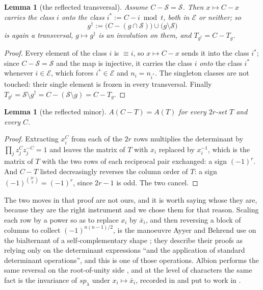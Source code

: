 \documentclass[11pt,reqno]{amsart}
\theoremstyle{plain}
\newtheorem{lemma}[theorem]{Lemma}
\theoremstyle{definition}
\begin{document}
\begin{lemma}[the reflected transversal]\label{lem:reflact}
Assume $C-\mathcal{S}=\mathcal{S}$. Then $x\mapsto C-x$ carries the class $i$ onto the class
$i^{*}:=C-i \bmod t$, both in $\mathcal{E}$ or neither; so
\[
g^{\dagger}:=\bigl(C-(g\cap\mathcal{S})\bigr)\cup\bigl(g\setminus\mathcal{S}\bigr)
\]
is again a transversal, $g\mapsto g^{\dagger}$ is an involution on them, and $T_{g^{\dagger}}=C-T_g$.
\end{lemma}

\begin{proof}
Every element of the class $i$ is $\equiv i$, so $x\mapsto C-x$ sends it into the class $i^{*}$; since
$C-\mathcal{S}=\mathcal{S}$ and the map is injective, it carries the class $i$ \emph{onto} the
class $i^{*}$ whenever $i\in\mathcal{E}$, which forces $i^{*}\in\mathcal{E}$ and $n_i=n_{i^{*}}$. The
singleton classes are not touched: their single element is frozen in every transversal. Finally
$T_{g^{\dagger}}=\mathcal{S}\setminus g^{\dagger}=C-(\mathcal{S}\setminus g)=C-T_g$.
\end{proof}

\begin{lemma}[the reflected minor]\label{lem:Arefl}
$A(C-T)=A(T)$ for every $2r$-set $T$ and every $C$.
\end{lemma}

\begin{proof}
Extracting $x_i^{C}$ from each of the $2r$ rows multiplies the determinant by
$\prod_j z_j^{C}z_j^{-C}=1$ and leaves the matrix of $T$ with $x_i$ replaced by $x_i^{-1}$, which is
the matrix of $T$ with the two rows of each reciprocal pair exchanged: a sign $(-1)^{r}$. And
$C-T$ listed decreasingly reverses the column order of $T$: a sign $(-1)^{\binom{2r}{2}}=(-1)^{r}$,
since $2r-1$ is odd. The two cancel.
\end{proof}

\noindent The two moves in that proof are not ours, and it is worth saying whose they are, because
they are the right instrument and we chose them for that reason. Scaling each row by a power so as
to replace $x_i$ by $\bar x_i$, and then reversing a block of columns to collect
$(-1)^{n(n-1)/2}$, is the manoeuvre Ayyer and Behrend use on the bialternant of a
self-complementary shape \cite[\S3]{AB19}; they describe their proofs as relying only on the
determinant expressions ``and the application of standard determinant operations'', and this is one
of those operations. Albion performs the same reversal on the root-of-unity side
\cite{Alb23,Alb25}, and at the level of characters the same fact is the invariance of $sp_\lambda$
under $x_i\mapsto\bar x_i$, recorded in \cite{AB19} and put to work in \cite{AF20}.
\end{document}

